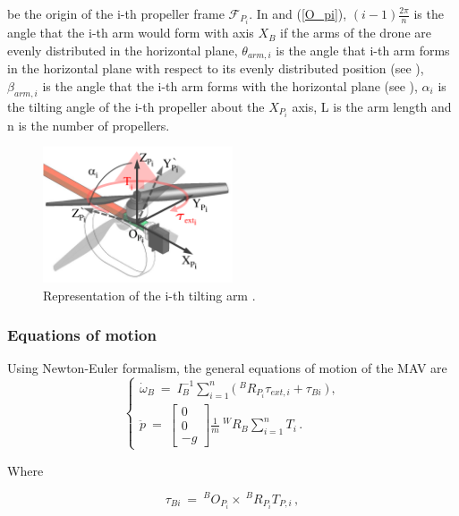 be the origin of the i-th propeller frame  $\mathcal{F}_{P_{i}}$.
In  and (\ref{O_pi}), $(i-1)\frac{2\pi}{n}$ is the angle that
the i-th arm would form with axis $X_B$ if the arms of the drone are evenly
distributed in the horizontal plane, $\theta_{arm,i}$ is the angle that i-th arm forms
in the horizontal plane with respect to its evenly distributed position
(see ), $\beta_{arm,i}$ is the angle that the i-th arm forms with
the horizontal plane (see ), $\alpha_{i}$ is the tilting
angle of the i-th propeller about the $X_{P_{i}}$ axis, L is the arm length and
n is the number of propellers.

\begin{figure}[h]
  \centering
  \includegraphics[width=0.5\textwidth]{images/tilt_model.png}
  \caption{Representation of the i-th tilting arm \citep{ryll_modeling_2012}.}
  \label{fig:tilt_model}
\end{figure}

\subsubsection{Equations of motion}
\label{sec:equations}
Using Newton-Euler formalism, the general equations of motion of the MAV are
\begin{equation}
  \label{acc_eq}
  \begin{cases}
    \dot{\omega}_B  \ = \ I_B^{-1} \sum_{i=1}^{n}  \big(\ ^{B}R_{P_{i}} \tau_{ext,i} + \tau_{Bi} \ \big) \, ,\\
    \ddot{p}  \ = \
    \begin{bmatrix}
      0 \\
      0 \\
      -g
    \end{bmatrix}
    \frac{1}{m} \ ^{W}R_B \sum_{i=1}^{n} T_i \, .
  \end{cases}
\end{equation}

Where

\begin{equation}
  \label{tau_b_i}
  \tau_{Bi}  \ = \ ^{B}O_{P_{i}} \times\   ^{B}R_{P_{i}} T_{P,i}\, ,
\end{equation}

